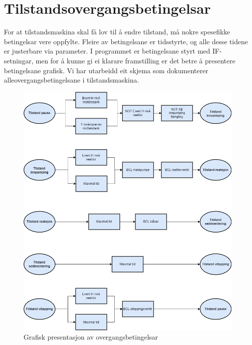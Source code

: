 \section{Tilstandsovergangsbetingelsar}
\thispagestyle{fancy}

For at tilstandsmaskina skal få lov til å endre tilstand, må nokre spesefikke betingelsar vere oppfylte.
Fleire av betingelsane er tidsstyrte, og alle desse tidene er justerbare via parameter.\newline
I programmet er betingelsane styrt med IF-setningar, men for å kunne gi ei klarare framstilling er det betre å presentere betingelsane grafisk.
Vi har utarbeidd eit skjema som dokumenterer alle\newline overgangsbetingelsane i tilstandsmaskina.\newline \newline

\begin{figure}[htbp]
    \centering
    \includegraphics[scale=0.5]{Figurar/Tilstandsovergang.drawio.png}
    \caption{Grafisk presentasjon av overgangsbetingelsar}\label{fig:Tilstandsovergangsbetingelsar}
\end{figure}

\newpage